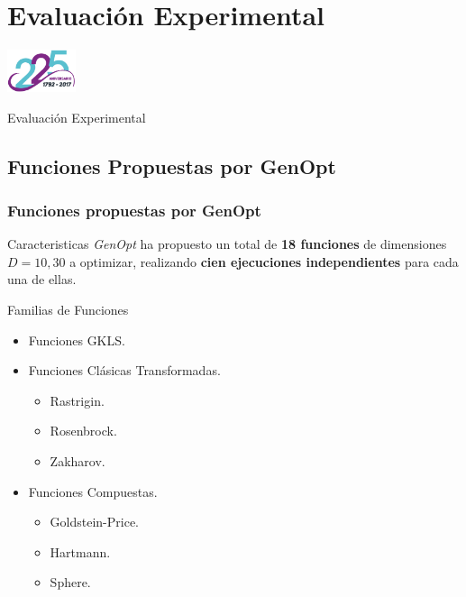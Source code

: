 \section{Evaluación Experimental}

\begin{frame}
  \centering
  \includegraphics[width=0.15\textwidth]{img/ullesc.eps}
  \begin{scriptsize}
    \begin{center}
    \Huge{Evaluación Experimental}
    \end{center}
  \end{scriptsize}
\end{frame}

\subsection{Funciones Propuestas por GenOpt}
\begin{frame}
\frametitle{Funciones propuestas por GenOpt}
\begin{block}{Caracteristicas}
\textit{GenOpt} ha propuesto un total de \textbf{18 funciones} de dimensiones $D = 10, 30$ a optimizar, realizando \textbf{cien ejecuciones independientes} para cada una de ellas.
\end{block}
\begin{block}{Familias de Funciones}
\begin{itemize}
	\item Funciones GKLS.
	\item Funciones Clásicas Transformadas.
	 \begin{itemize}
    	\item Rastrigin. 
    	\item Rosenbrock. 
    	\item Zakharov. 
    \end{itemize}
	\item Funciones Compuestas.
	 \begin{itemize}
    	  	\item Goldstein-Price.
    	  	\item Hartmann. 
    	  	\item Sphere.
    	  \end{itemize}
\end{itemize}
\end{block}
\end{frame}

